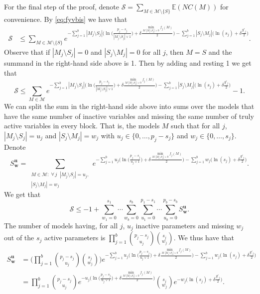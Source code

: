 \documentclass[bj,authoryear]{imsart}
\theoremstyle{plain}
\newcommand{\E}{\mathbb{E}}
\newcommand{\M}{\mathcal{M}}
\newcommand{\bs}{\boldsymbol}
\begin{document}
For the final step of the proof, denote $\mathcal{S}= \sum_{M \in \M\setminus \{S\}} \E\left(NC(M)\right)$ for convenience. By \eqref{eq:fyvbis} we have that
\begin{align*}
    \mathcal{S} &\leq \sum_{M \in \M\setminus \{S\}}e^{- \sum_{j=1}^b |M_j\setminus S_j|\big(\ln\big(\tfrac{p_j-s_j}{|M_j\setminus S_j|\vee 1}\big)+\delta \tfrac{\min_{M: |M_j\setminus S_j|>0}f_j(M)}{2}\big)-\sum_{j=1}^b |S_j\setminus M_j|\big(\ln(s_j)+\delta \tfrac{g'_j}{2}\big)}.
\end{align*}
Observe that if $|M_j\setminus S_j|=0$ and $|S_j\setminus M_j|=0$ for all $j$, then $M=S$ and the summand in the right-hand side above is 1. Then by adding and resting 1 we get that
$$\mathcal{S} \leq \sum_{M \in \M}e^{- \sum_{j=1}^b |M_j\setminus S_j|\big(\ln\big(\tfrac{p_j-s_j}{|M_j\setminus S_j|\vee 1}\big)+\delta \tfrac{\min_{M: |M_j\setminus S_j|>0}f_j(M)}{2}\big)-\sum_{j=1}^b |S_j\setminus M_j|\big(\ln(s_j)+\delta \tfrac{g'_j}{2}\big)}-1.$$
We can split the sum in the right-hand side above into sums over the models that have the same number of inactive variables and missing the same number of truly active variables in every block. That is, the models $M$ such that for all $j$, $|M_j\setminus S_j|=u_j$ and $|S_j\setminus M_j|=w_j$ with $u_j \in \{0,\ldots,p_j-s_j\}$ and $w_j \in \{0,\ldots,s_j\}$. Denote
$$S^{\bs u}_{\bs w}=\sum_{\substack{M \in \M:\;\forall \,j\;\; |M_j\setminus S_j|=u_j,\\ |S_j\setminus M_j|=w_j }} e^{- \sum_{j=1}^b u_j\big(\ln\big(\tfrac{p_j-s_j}{u_j\vee 1}\big)+\delta \tfrac{\min_{M: |M_j\setminus S_j|>0}f_j(M)}{2}\big)-\sum_{j=1}^b w_j\big(\ln(s_j)+\delta \tfrac{g'_j}{2}\big)}.$$
We get that
\begin{equation}\label{eq:uygfewbis}
    \mathcal{S} \leq -1+\sum_{w_1=0}^{s_1}\cdots\sum_{w_b=0}^{s_b}\sum_{u_1=0}^{p_1-s_1}\cdots\sum_{u_b=0}^{p_b-s_b}S^{\bs u}_{\bs w}.
\end{equation}
The number of models having, for all $j$, $u_j$ inactive parameters and missing $w_j$ out of the $s_j$ active parameters %
is $\prod_{j=1}^b {\binom{p_j-s_j}{u_j}}{\binom{s_j}{w_j}}$. We thus have that
\begin{align*}
    S^{\bs u}_{\bs w}&= \bigg(\prod_{j=1}^b {\binom{p_j-s_j}{u_j}}{\binom{s_j}{w_j}}\bigg)e^{- \sum_{j=1}^b u_j\big(\ln\big(\tfrac{p_j-s_j}{u_j\vee 1}\big)+\delta \tfrac{\min_{M: |M_j\setminus S_j|>0}f_j(M)}{2}\big)-\sum_{j=1}^b w_j\big(\ln(s_j)+\delta \tfrac{g'_j}{2}\big)} \\
    &= \prod_{j=1}^b {\binom{p_j-s_j}{u_j}}e^{- u_j\big(\ln\big(\tfrac{p_j-s_j}{u_j\vee 1}\big)+\delta \tfrac{\min_{M: |M_j\setminus S_j|>0}f_j(M)}{2}\big)}{\binom{s_j}{w_j}}e^{-w_j\big(\ln(s_j)+\delta \tfrac{g'_j}{2}\big)}.
\end{align*}
\end{document}
